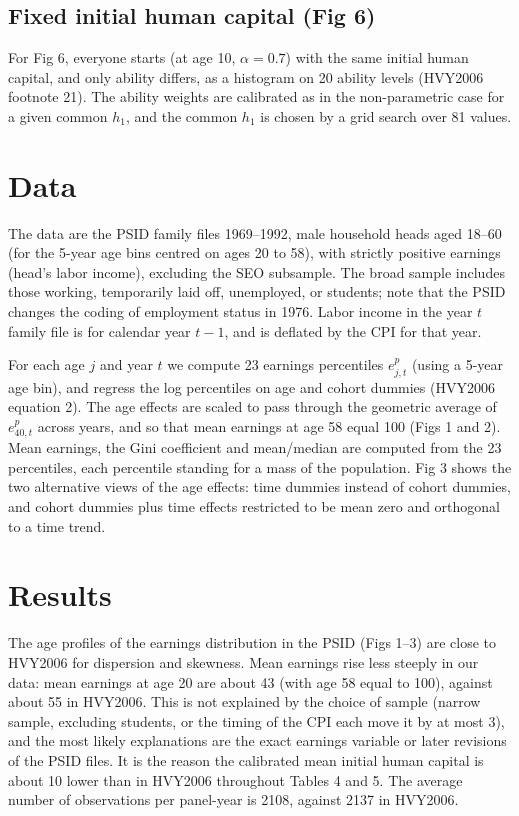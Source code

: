 \documentclass[11pt,fleqn]{article}
\begin{document}
\subsection{Fixed initial human capital (Fig 6)}

For Fig 6, everyone starts (at age 10, $\alpha=0.7$) with the same initial human capital, and only ability differs, as a histogram on 20 ability levels (HVY2006 footnote 21). The ability weights are calibrated as in the non-parametric case for a given common $h_1$, and the common $h_1$ is chosen by a grid search over 81 values.


\section{Data}

The data are the PSID family files 1969--1992, male household heads aged 18--60 (for the 5-year age bins centred on ages 20 to 58), with strictly positive earnings (head's labor income), excluding the SEO subsample. The broad sample includes those working, temporarily laid off, unemployed, or students; note that the PSID changes the coding of employment status in 1976. Labor income in the year $t$ family file is for calendar year $t-1$, and is deflated by the CPI for that year.

For each age $j$ and year $t$ we compute 23 earnings percentiles $e^p_{j,t}$ (using a 5-year age bin), and regress the log percentiles on age and cohort dummies (HVY2006 equation 2). The age effects are scaled to pass through the geometric average of $e^p_{40,t}$ across years, and so that mean earnings at age 58 equal 100 (Figs 1 and 2). Mean earnings, the Gini coefficient and mean/median are computed from the 23 percentiles, each percentile standing for a mass of the population. Fig 3 shows the two alternative views of the age effects: time dummies instead of cohort dummies, and cohort dummies plus time effects restricted to be mean zero and orthogonal to a time trend.


\section{Results}

The age profiles of the earnings distribution in the PSID (Figs 1--3) are close to HVY2006 for dispersion and skewness. Mean earnings rise less steeply in our data: mean earnings at age 20 are about 43 (with age 58 equal to 100), against about 55 in HVY2006. This is not explained by the choice of sample (narrow sample, excluding students, or the timing of the CPI each move it by at most 3), and the most likely explanations are the exact earnings variable or later revisions of the PSID files. It is the reason the calibrated mean initial human capital is about 10 lower than in HVY2006 throughout Tables 4 and 5. The average number of observations per panel-year is 2108, against 2137 in HVY2006.
\end{document}
